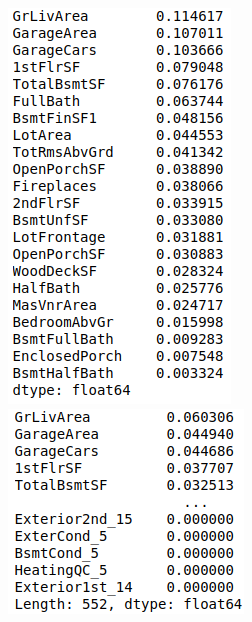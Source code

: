 \begin{figure}%
\begin{center}
\begin{minipage}{.5\textwidth}
  \centering
  \includegraphics[width=0.7\linewidth]{imgs/feature_scores_numerical.png}
\end{minipage}%
\begin{minipage}{.5\textwidth}
  \centering
  \includegraphics[width=0.7\linewidth]{imgs/feature_scores_categorical.png}

\end{minipage}
\end{center}
\end{figure}
